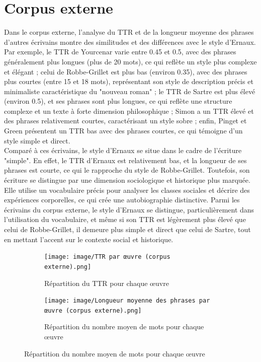 \section{Corpus externe}
Dans le corpus externe, l’analyse du TTR et de la longueur moyenne des phrases d’autres écrivains montre des similitudes et des différences avec le style d'Ernaux. Par exemple, le TTR de Yourcenar varie entre 0.45 et 0.5, avec des phrases généralement plus longues (plus de 20 mots), ce qui reflète un style plus complexe et élégant ; celui de Robbe-Grillet est plus bas (environ 0.35), avec des phrases plus courtes (entre 15 et 18 mots), représentant son style de description précis et minimaliste caractéristique du "nouveau roman" ; le TTR de Sartre est plus élevé (environ 0.5), et ses phrases sont plus longues, ce qui reflète une structure complexe et un texte à forte dimension philosophique ; Simon a un TTR élevé et des phrases relativement courtes, caractérisant un style sobre ; enfin, Pinget et Green présentent un TTR bas avec des phrases courtes, ce qui témoigne d’un style simple et direct.\\

Comparé à ces écrivains, le style d'Ernaux se situe dans le cadre de l’écriture "simple". En effet, le TTR d'Ernaux est relativement bas, et la longueur de ses phrases est courte, ce qui le rapproche du style de Robbe-Grillet. Toutefois, son écriture se distingue par une dimension sociologique et historique plus marquée. Elle utilise un vocabulaire précis pour analyser les classes sociales et décrire des expériences corporelles, ce qui crée une autobiographie distinctive. Parmi les écrivains du corpus externe, le style d'Ernaux se distingue, particulièrement dans l’utilisation du vocabulaire, et même si son TTR est légèrement plus élevé que celui de Robbe-Grillet, il demeure plus simple et direct que celui de Sartre, tout en mettant l’accent sur le contexte social et historique.
\begin{figure}[ht!]
    \centering
    \begin{subfigure}[b]{0.8\textwidth}
        \centering
        \texttt{[image: image/TTR par œuvre (corpus externe).png]}
        \caption{Répartition du TTR pour chaque œuvre}
        \label{fig:TTR_externe}
    \end{subfigure}
    
    \vspace{0.5cm} %

    \begin{subfigure}[b]{0.8\textwidth}
        \centering
        \texttt{[image: image/Longueur moyenne des phrases par œuvre (corpus externe).png]}
        \caption{Répartition du nombre moyen de mots pour chaque œuvre}
        \label{fig:mots_moyens_externe}
    \end{subfigure}
\end{figure}

